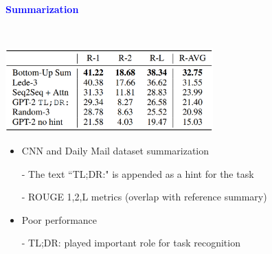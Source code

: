 \documentclass[professionalfont]{beamer}
\begin{document}
\begin{frame}

\begin{center}
    { \textbf{\textcolor{blue}{ {\fontsize{12}{14}\selectfont Summarization} }} }
\end{center}
\\[0.3cm]
\begin{center}
    \includegraphics[width=0.6\textwidth]{table4.png}
\end{center}

{\fontsize{10}{14}\selectfont 
\begin{itemize}
    \item CNN and Daily Mail dataset summarization
    
    - The text ``TL;DR:" is appended as a hint for the task
    
    - ROUGE 1,2,L metrics (overlap with reference summary)

    \item Poor performance
    
    - TL;DR: played important role for task recognition
\end{itemize}
}

\end{frame}
\end{document}
